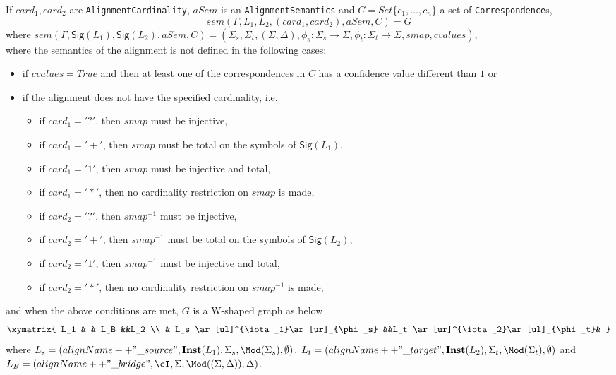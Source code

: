 \documentclass[10pt, a4paper]{isov2}
\newcommand*{\syntax}[1]{\texttt{#1}}
\newcommand{\Sig}{\mathsf{Sig}}
\newcommand{\Inst}{\ensuremath{\mathbf{Inst}}}
\begin{document}
If $card_1, card_2$ are \syntax{AlignmentCardinality}, 
$aSem$ is an \syntax{AlignmentSemantics}
and $C = Set\{c_1, \ldots, c_n\}$ a set of \syntax{Correspondence}s,
$$sem(\Gamma, L_1, L_2, (card_1,card_2), aSem, C)=
G$$
\noindent
where
$sem(\Gamma, \Sig(L_1),\Sig(L_2), aSem, C) = (\Sigma_s,\Sigma_t,(\Sigma,\Delta),\phi_s:\Sigma_s\to\Sigma,\phi_t:\Sigma_t\to\Sigma, smap, cvalues)$,\\
where the semantics of the alignment is not defined in the following cases:
 \begin{itemize} 
\item
if $cvalues = True$ and then at least one of the correspondences in $C$ has a confidence value different than $1$ or
\item if the alignment does not have the specified cardinality, i.e.
 \begin{itemize} 
\item if $card_1 = '?'$, then $smap$ must be injective,
\item if $card_1 = '+'$, then $smap$ must be total on the symbols of $\Sig(L_1)$,
\item if $card_1 = '1'$, then $smap$ must be injective and total,
\item if $card_1 = '*'$, then no cardinality restriction on $smap$ is made,
 \end{itemize} 
 \begin{itemize} 
\item if $card_2 = '?'$, then $smap^{-1}$ must be injective,
\item if $card_2 = '+'$, then $smap^{-1}$ must be total on the symbols of $\Sig(L_2)$,
\item if $card_2 = '1'$, then $smap^{-1}$ must be injective and total,
\item if $card_2 = '*'$, then no cardinality restriction on $smap^{-1}$ is made,
 \end{itemize} 
 \end{itemize} 
\noindent and when the above conditions are met,  
$G$ is a W-shaped graph as below
$$
\xymatrix{
L_1 & &  L_B &&L_2 \\
 & L_s \ar[ul]^{\iota_1}\ar[ur]_{\phi_s} &&L_t \ar[ur]^{\iota_2}\ar[ul]_{\phi_t}& 
}
$$
where
$L_s = (alignName++"\_source", \Inst(L_1) ,\Sigma_s,\Mod(\Sigma_s),\emptyset)$,
$L_t = (alignName++"\_target", \Inst(L_2) ,\Sigma_t,\Mod(\Sigma_t),\emptyset)$
and
$L_B = (alignName++"\_bridge", \cI ,\Sigma,\Mod((\Sigma,\Delta)),\Delta)$.

\end{document}
